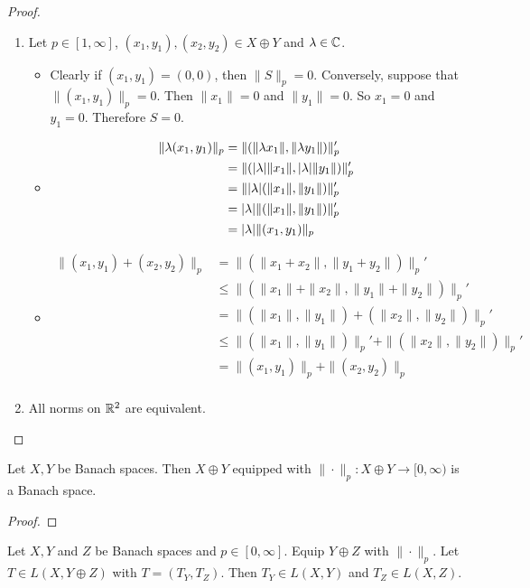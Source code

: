 \documentclass{book}
\begin{document}
	\begin{proof}\
	\begin{enumerate}
	\item Let $p \in [1, \infty]$, $(x_1,y_1), (x_2,y_2) \in X \oplus Y$ and $\lambda \in \mathbb{C}$.
	\begin{itemize}
	\item Clearly if $(x_1, y_1) = (0,0)$, then $\|S\|_p = 0$. Conversely, suppose that $\|(x_1, y_1)\|_p = 0$. Then $\|x_1\| = 0$ and $\|y_1\| = 0$. So $x_1 = 0$ and $y_1 = 0$. Therefore $S = 0$. 
	\item 
	\begin{align*}
	\|\lambda (x_1, y_1)\|_p
	&= \|(\|\lambda x_1\|, \|\lambda y_1\|)\|_p' \\
	&= \|(|\lambda|\| x_1\|, |\lambda|\|y_1 \|)\|_p' \\
	&= \||\lambda| (\| x_1\|,\|y_1\| )\|_p' \\
	&= |\lambda| \|(\| x_1\|,\|y_1\|)\|_p' \\
	&= |\lambda| \| (x_1, y_1)\|_p
	\end{align*}
	\item 
	\begin{align*}
	\|(x_1, y_1) + (x_2, y_2)\|_p
	&= \|(\|x_1 + x_2\|, \|y_1 + y_2\|)\|_p' \\
	&\leq \|(\|x_1\| + \|x_2\|, \|y_1\| + \|y_2\|)\|_p' \\
	&= \|(\|x_1\|, \|y_1\|) + (\|x_2\|, \|y_2\|)\|_p' \\
	&\leq \|(\|x_1\|, \|y_1\|)\|_p' + \|(\|x_2\|, \|y_2\|)\|_p' \\
	&= \|(x_1, y_1)\|_p + \|(x_2, y_2)\|_p \\ 
	\end{align*}
	\end{itemize}
	\item All norms on $\mathbb{R}^2$ are equivalent.
	\end{enumerate}
\end{proof}		

\begin{ex} \lex{}	
	Let $X, Y$ be Banach spaces. Then $X \oplus Y$ equipped with $\|\cdot \|_p:X \oplus Y \rightarrow [0, \infty)$ is a Banach space. 
	\end{ex}
	
	\begin{proof}
	
	\end{proof}
	
	\begin{ex}
	Let $X, Y$ and $Z$ be Banach spaces and $p \in [0, \infty]$. Equip $Y \oplus Z$ with $\|\cdot\|_p$. Let $T \in L(X, Y \oplus Z)$ with $T = (T_Y, T_Z)$. Then $T_Y \in L(X, Y)$ and $T_Z \in L(X, Z)$.
	\end{ex}
	
\end{document}
